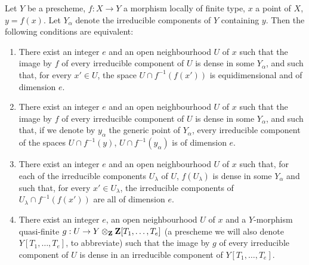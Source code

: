 \begin{proposition}[13.3.1]
\label{IV.13.3.1}
Let $Y$ be a prescheme, $f:X\to Y$ a morphism locally of finite type, $x$ a point of $X$, $y=f(x)$.
Let $Y_\alpha$ denote the irreducible components of $Y$ containing $y$.
Then the following conditions are equivalent:
\begin{enumerate}[label=\emph{\alph*)}]
  \item There exist an integer $e$ and an open neighbourhood $U$ of $x$ such that the image by $f$ of every irreducible component of $U$ is dense in some $Y_\alpha$, and such that, for every $x'\in U$, the space $U\cap f^{-1}(f(x'))$ is equidimensional and of dimension $e$.
  \item[\emph{a$'$)}] There exist an integer $e$ and an open neighbourhood $U$ of $x$ such that the image by $f$ of every irreducible component of $U$ is dense in some $Y_\alpha$, and such that, if we denote by $y_\alpha$ the generic point of $Y_\alpha$, every irreducible component of the spaces $U\cap f^{-1}(y)$, $U\cap f^{-1}(y_\alpha)$ is of dimension $e$.
  \item[\emph{a$''$)}] There exist an integer $e$ and an open neighbourhood $U$ of $x$ such that, for each of the irreducible components $U_\lambda$ of $U$, $f(U_\lambda)$ is dense in some $Y_\alpha$ and such that, for every $x'\in U_\lambda$, the irreducible components of $U_\lambda\cap f^{-1}(f(x'))$ are all of dimension $e$.
  \item There exist an integer $e$, an open neighbourhood $U$ of $x$ and a $Y$-morphism quasi-finite $g:U\to Y\otimes_{\mathbf{Z}}\mathbf{Z}[T_1,\ldots,T_e]$ (a prescheme we will also denote $Y[T_1,\ldots,T_e]$, to abbreviate) such that the image by $g$ of every irreducible component of $U$ is dense in an irreducible component of $Y[T_1,\ldots,T_e]$.
\end{enumerate}
\end{proposition}

